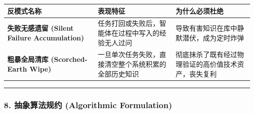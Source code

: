 {\def\LTcaptype{} %
\begin{longtable}[]{@{}
  >{\raggedright\arraybackslash}p{}
  >{\raggedright\arraybackslash}p{}
  >{\raggedright\arraybackslash}p{}@{}}
\toprule\noalign{}
\begin{minipage}[b]{\linewidth}\raggedright
反模式名称
\end{minipage} & \begin{minipage}[b]{\linewidth}\raggedright
表现特征
\end{minipage} & \begin{minipage}[b]{\linewidth}\raggedright
为什么必须杜绝
\end{minipage} \\
\midrule\noalign{}
\endhead
\bottomrule\noalign{}
\endlastfoot
\textbf{失败无感遗留 (Silent Failure Accumulation)} &
任务打回或失败后，智能体在过程中写入的经验无人过问 &
导致有害知识在库中静默潜伏，成为定时炸弹 \\
\textbf{粗暴全局清库 (Scorched-Earth Wipe)} &
一旦单次任务失败，直接清空整个系统积累的全部历史知识 &
彻底抹杀了既有经过物理验证的高价值技术资产，丧失复利 \\
\end{longtable}
}

\begin{center}\rule{0.5\linewidth}{0.5pt}\end{center}

\subsubsection{8. 抽象算法规约 (Algorithmic
Formulation)}\label{ux62bdux8c61ux7b97ux6cd5ux89c4ux7ea6-algorithmic-formulation-13}

